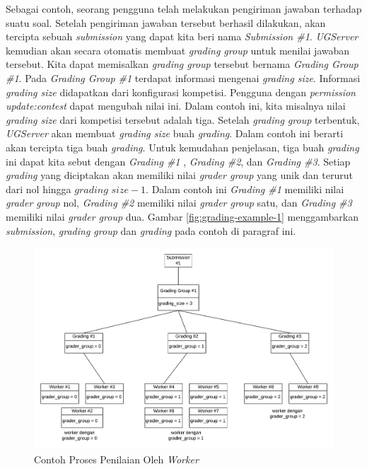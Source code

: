 \par Sebagai contoh, seorang pengguna telah melakukan pengiriman jawaban terhadap suatu soal. Setelah pengiriman jawaban tersebut berhasil dilakukan, akan tercipta sebuah \textit{submission} yang dapat kita beri nama \textit{Submission \#1}. \textit{UGServer} kemudian akan secara otomatis membuat \textit{grading group} untuk menilai jawaban tersebut. Kita dapat memisalkan \textit{grading group} tersebut bernama \textit{Grading Group \#1}. Pada \textit{Grading Group \#1} terdapat informasi mengenai \textit{grading size}. Informasi \textit{grading size} didapatkan dari konfigurasi kompetisi. Pengguna dengan \textit{permission update:contest} dapat mengubah nilai ini. Dalam contoh ini, kita misalnya nilai \textit{grading size} dari kompetisi tersebut adalah tiga. Setelah \textit{grading group} terbentuk, \textit{UGServer} akan membuat \textit{grading size} buah \textit{grading}. Dalam contoh ini berarti akan tercipta tiga buah \textit{grading}. Untuk kemudahan penjelasan, tiga buah \textit{grading} ini dapat kita sebut dengan \textit{Grading \#1} , \textit{Grading \#2}, dan \textit{Grading \#3}. Setiap \textit{grading} yang diciptakan akan memiliki nilai \textit{grader group} yang unik dan terurut dari nol hingga $\textit{grading size} - 1$. Dalam contoh ini \textit{Grading \#1} memiliki nilai \textit{grader group} nol, \textit{Grading \#2} memiliki nilai \textit{grader group} satu, dan \textit{Grading \#3} memiliki nilai \textit{grader group} dua. Gambar \ref{fig:grading-example-1} menggambarkan \textit{submission}, \textit{grading group} dan \textit{grading} pada contoh di paragraf ini.

\begin{figure}[ht!]
    \centering
    \includegraphics[width=\textwidth]{images/grading-example-2}
    \caption{Contoh Proses Penilaian Oleh \textit{Worker}}
    \label{fig:grading-example-2}
\end{figure}

